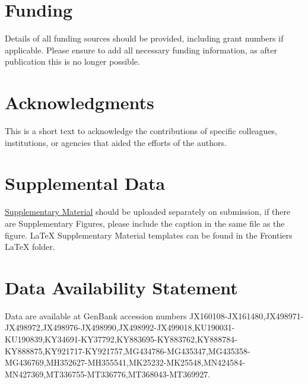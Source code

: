 \documentclass[utf8]{FrontiersinHarvard} %
\begin{document}
\section*{Funding}
Details of all funding sources should be provided, including grant numbers if applicable. Please ensure to add all necessary funding information, as after publication this is no longer possible.

\section*{Acknowledgments}
This is a short text to acknowledge the contributions of specific colleagues, institutions, or agencies that aided the efforts of the authors.

\section*{Supplemental Data}
\href{https://www.frontiersin.org/guidelines/author-guidelines#supplementary-material}{Supplementary Material} should be uploaded separately on submission, if there are Supplementary Figures, please include the caption in the same file as the figure. LaTeX Supplementary Material templates can be found in the Frontiers LaTeX folder.

\section*{Data Availability Statement}

Data are available at GenBank accession numbers
JX160108-JX161480,JX498971-JX498972,JX498976-JX498990,JX498992-JX499018,KU190031-KU190839,KY34691-KY37792,KY883695-KY883762,KY888784-KY888875,KY921717-KY921757,MG434786-MG435347,MG435358-MG436769,MH352627-MH355541,MK25232-MK25548,MN424584-MN427369,MT336755-MT336776,MT368043-MT369927.


\nocite{*}
\end{document}
